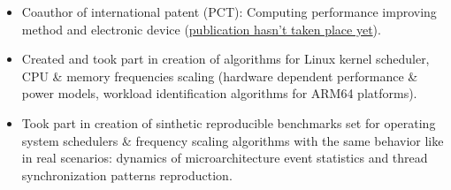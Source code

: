 
    \begin{itemize}
        \item Coauthor of international patent (PCT): Computing performance improving method and
            electronic device (\href{https://news.cision.com/crunchfish/i/pct-timeline,c2902203}
                                    {publication hasn't taken place yet}).
        \smallskip
        \item Created and took part in creation of algorithms for Linux kernel scheduler, CPU \& memory frequencies
            scaling (hardware dependent performance \& power models, workload identification algorithms for ARM64 platforms).
        \item Took part in creation of sinthetic reproducible benchmarks set for operating system
            schedulers \& frequency scaling algorithms with the same behavior like in real scenarios:
            dynamics of microarchitecture event statistics and thread synchronization patterns reproduction.
    \end{itemize}

    \smallskip

